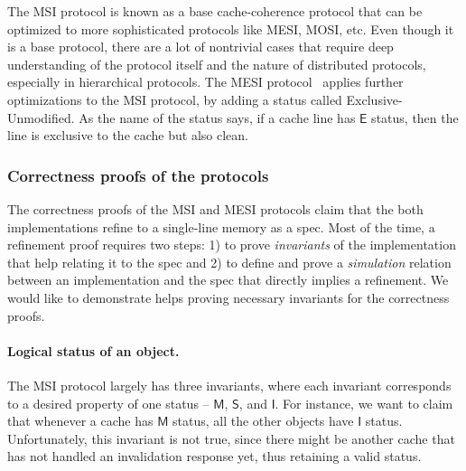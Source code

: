 \newcommand{\mesi}{\ensuremath{\textsf{MESI}}}
\newcommand{\msi}{\ensuremath{\textsf{MSI}}}
\newcommand{\stM}{\ensuremath{\textsf{M}}}
\newcommand{\stE}{\ensuremath{\textsf{E}}}
\newcommand{\stS}{\ensuremath{\textsf{S}}}
\newcommand{\stI}{\ensuremath{\textsf{I}}}
\newcommand{\dir}[2]{\ensuremath{#1_{\tuple{#2}}}}

The MSI protocol is known as a base cache-coherence protocol that can be optimized to more sophisticated protocols like MESI, MOSI, etc.
Even though it is a base protocol, there are a lot of nontrivial cases that require deep understanding of the protocol itself and the nature of distributed protocols, especially in hierarchical protocols.
The MESI protocol~\cite{Papamarcos:1984} applies further optimizations to the MSI protocol, by adding a status called Exclusive-Unmodified.
As the name of the status says, if a cache line has \stE{} status, then the line is exclusive to the cache but also clean.

\subsubsection{Correctness proofs of the protocols}

The correctness proofs of the MSI and MESI protocols claim that the both implementations refine to a single-line memory as a spec.
Most of the time, a refinement proof requires two steps: 1) to prove \emph{invariants} of the implementation that help relating it to the spec and 2) to define and prove a \emph{simulation} relation between an implementation and the spec that directly implies a refinement.
We would like to demonstrate \hemiola{} helps proving necessary invariants for the correctness proofs.

\paragraph{Logical status of an object.}
The MSI protocol largely has three invariants, where each invariant corresponds to a desired property of one status -- \stM{}, \stS{}, and \stI{}.
For instance, we want to claim that whenever a cache has \stM{} status, all the other objects have \stI{} status.
Unfortunately, this invariant is not true, since there might be another cache that has not handled an invalidation response yet, thus retaining a valid status.

